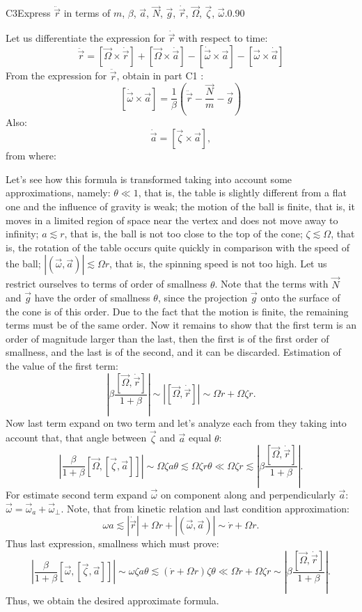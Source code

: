 \documentclass[11pt,a4paper]{article}
\begin{document}
\begin{solcard}{C3}{Express $\ddot{\vec r}$ in terms of $m$, $\beta$, $\vec a$, $\vec N$, $\vec g$, $\dot{\vec r}$, $\vec\Omega$, $\vec \zeta$, $\vec \omega$.}{0.90}

Let us differentiate the expression for $\dot{\vec r}$ with respect to time: $$ \ddot{\vec r} = \left[\vec \Omega \times \dot{\vec r}\right] + \left[\vec \Omega \times \dot{\vec a}\right] - [\dot{\vec \omega} \times \vec a] - [\vec \omega \times \dot{\vec a}] $$ From the expression for $\ddot{\vec r}$, obtain in part C1 : $$ [\dot{\vec \omega} \times \vec a] = \frac{1}{\beta} \left(\ddot{\vec r} - \frac{\vec N}{m} - \vec g\right) $$ Also: $$ \dot{\vec a} = \left[\vec \zeta \times \vec a\right], $$ from where:


Let's see how this formula is transformed taking into account some approximations, namely: $\theta \ll 1$, that is, the table is slightly different from a flat one and the influence of gravity is weak; the motion of the ball is finite, that is, it moves in a limited region of space near the vertex and does not move away to infinity; $a \lesssim r$, that is, the ball is not too close to the top of the cone; $\zeta \lesssim \Omega$, that is, the rotation of the table occurs quite quickly in comparison with the speed of the ball; $\left|\left(\vec\omega, \vec a\right) \right|\lesssim \Omega r$, that is, the spinning speed is not too high. Let us restrict ourselves to terms of order of smallness $\theta$. Note that the terms with $\vec N$ and $\vec g$ have the order of smallness $\theta$, since the projection $\vec g$ onto the surface of the cone is of this order. Due to the fact that the motion is finite, the remaining terms must be of the same order. Now it remains to show that the first term is an order of magnitude larger than the last, then the first is of the first order of smallness, and the last is of the second, and it can be discarded. Estimation of the value of the first term: $$\left|\beta\frac{[\vec \Omega, \dot{\vec r}]}{1 + \beta}\right|\sim \left|[\vec \Omega, \dot{\vec r}]\right|\sim \Omega \dot r + \Omega \zeta r.$$ Now last term expand on two term and let's analyze each from they taking into account that, that angle between $\vec\zeta$ and $\vec a$ equal $\theta$: $$\left|\frac{\beta}{1 + \beta}\left[\vec \Omega, \left[\vec \zeta, \vec a\right]\right]\right|\sim\Omega\zeta a\theta \lesssim \Omega\zeta r\theta \ll \Omega\zeta r \lesssim \left|\beta\frac{[\vec \Omega, \dot{\vec r}]}{1 + \beta}\right|.$$ For estimate second term expand $\vec\omega$ on component along and perpendicularly $\vec a$: $\vec \omega = \vec \omega_a + \vec \omega_\perp$. Note, that from kinetic relation and last condition approximation: $$\omega a \lesssim \left|\dot{\vec r}\right|+\Omega r +\left|\left(\vec\omega, \vec a\right) \right|\sim \dot r + \Omega r.$$ Thus last expression, smallness which must prove: $$\left|\frac{\beta}{1 + \beta}\left[\vec \omega, \left[\vec \zeta, \vec a\right]\right]\right|\sim\omega\zeta a\theta \lesssim \left(\dot r + \Omega r\right)\zeta \theta \ll \Omega \dot r + \Omega \zeta r\sim \left|\beta\frac{[\vec \Omega, \dot{\vec r}]}{1 + \beta}\right|.$$ Thus, we obtain the desired approximate formula.



\end{solcard}
\end{document}
